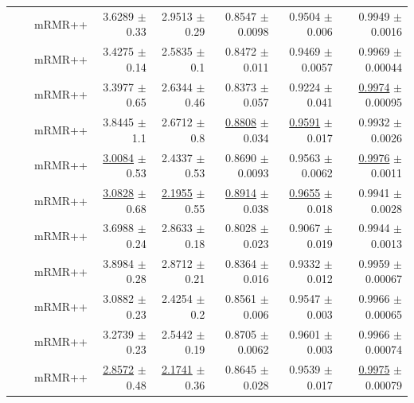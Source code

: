 \begin{longtable}{llp{}rrrrr}
 &  & mRMR++ & 3.6289 {\scriptsize $\pm$ 0.33} & 2.9513 {\scriptsize $\pm$ 0.29} & 0.8547 {\scriptsize $\pm$ 0.0098} & 0.9504 {\scriptsize $\pm$ 0.006} & 0.9949 {\scriptsize $\pm$ 0.0016} \\
 &  & mRMR++ & 3.4275 {\scriptsize $\pm$ 0.14} & 2.5835 {\scriptsize $\pm$ 0.1} & 0.8472 {\scriptsize $\pm$ 0.011} & 0.9469 {\scriptsize $\pm$ 0.0057} & 0.9969 {\scriptsize $\pm$ 0.00044} \\
 &  & mRMR++ & 3.3977 {\scriptsize $\pm$ 0.65} & 2.6344 {\scriptsize $\pm$ 0.46} & 0.8373 {\scriptsize $\pm$ 0.057} & 0.9224 {\scriptsize $\pm$ 0.041} & \underline{0.9974} {\scriptsize $\pm$ 0.00095} \\
 &  & mRMR++ & 3.8445 {\scriptsize $\pm$ 1.1} & 2.6712 {\scriptsize $\pm$ 0.8} & \underline{0.8808} {\scriptsize $\pm$ 0.034} & \underline{0.9591} {\scriptsize $\pm$ 0.017} & 0.9932 {\scriptsize $\pm$ 0.0026} \\
 &  & mRMR++ & \underline{3.0084} {\scriptsize $\pm$ 0.53} & 2.4337 {\scriptsize $\pm$ 0.53} & 0.8690 {\scriptsize $\pm$ 0.0093} & 0.9563 {\scriptsize $\pm$ 0.0062} & \underline{0.9976} {\scriptsize $\pm$ 0.0011} \\
 &  & mRMR++ & \underline{3.0828} {\scriptsize $\pm$ 0.68} & \underline{2.1955} {\scriptsize $\pm$ 0.55} & \underline{0.8914} {\scriptsize $\pm$ 0.038} & \underline{0.9655} {\scriptsize $\pm$ 0.018} & 0.9941 {\scriptsize $\pm$ 0.0028} \\
 &  & mRMR++ & 3.6988 {\scriptsize $\pm$ 0.24} & 2.8633 {\scriptsize $\pm$ 0.18} & 0.8028 {\scriptsize $\pm$ 0.023} & 0.9067 {\scriptsize $\pm$ 0.019} & 0.9944 {\scriptsize $\pm$ 0.0013} \\
 &  & mRMR++ & 3.8984 {\scriptsize $\pm$ 0.28} & 2.8712 {\scriptsize $\pm$ 0.21} & 0.8364 {\scriptsize $\pm$ 0.016} & 0.9332 {\scriptsize $\pm$ 0.012} & 0.9959 {\scriptsize $\pm$ 0.00067} \\
 &  & mRMR++ & 3.0882 {\scriptsize $\pm$ 0.23} & 2.4254 {\scriptsize $\pm$ 0.2} & 0.8561 {\scriptsize $\pm$ 0.006} & 0.9547 {\scriptsize $\pm$ 0.003} & 0.9966 {\scriptsize $\pm$ 0.00065} \\
 &  & mRMR++ & 3.2739 {\scriptsize $\pm$ 0.23} & 2.5442 {\scriptsize $\pm$ 0.19} & 0.8705 {\scriptsize $\pm$ 0.0062} & 0.9601 {\scriptsize $\pm$ 0.003} & 0.9966 {\scriptsize $\pm$ 0.00074} \\
 &  & mRMR++ & \underline{2.8572} {\scriptsize $\pm$ 0.48} & \underline{2.1741} {\scriptsize $\pm$ 0.36} & 0.8645 {\scriptsize $\pm$ 0.028} & 0.9539 {\scriptsize $\pm$ 0.017} & \underline{0.9975} {\scriptsize $\pm$ 0.00079} \\

\end{longtable}
